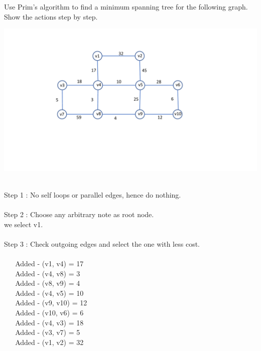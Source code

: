 \documentclass[addpoints,11pt]{exam}
\begin{document}
%
%
\begin{questions}
\question[10]
Use Prim's algorithm to find a minimum spanning tree for the following graph.  Show the actions step by step.

\includegraphics[scale=0.5]{g1.pdf}
\begin{solutionorbox}
\\
Step 1 : No self loops or parallel edges, hence do nothing. \\
\\
Step 2 : Choose any arbitrary note as root node. \\
we select v1.\\
\\
Step 3 : Check outgoing edges and select the one with less cost. \\
\\
$\hspace{15pt}$ Added - (v1, v4) = 17\\
$\hspace{15pt}$ Added - (v4, v8) = 3\\
$\hspace{15pt}$ Added - (v8, v9) = 4\\
$\hspace{15pt}$ Added - (v4, v5) = 10\\
$\hspace{15pt}$ Added - (v9, v10) = 12\\
$\hspace{15pt}$ Added - (v10, v6) = 6\\
$\hspace{15pt}$ Added - (v4, v3) = 18\\
$\hspace{15pt}$ Added - (v3, v7) = 5\\
$\hspace{15pt}$ Added - (v1, v2) = 32\\


\end{solutionorbox}
\end{questions}
\end{document}
